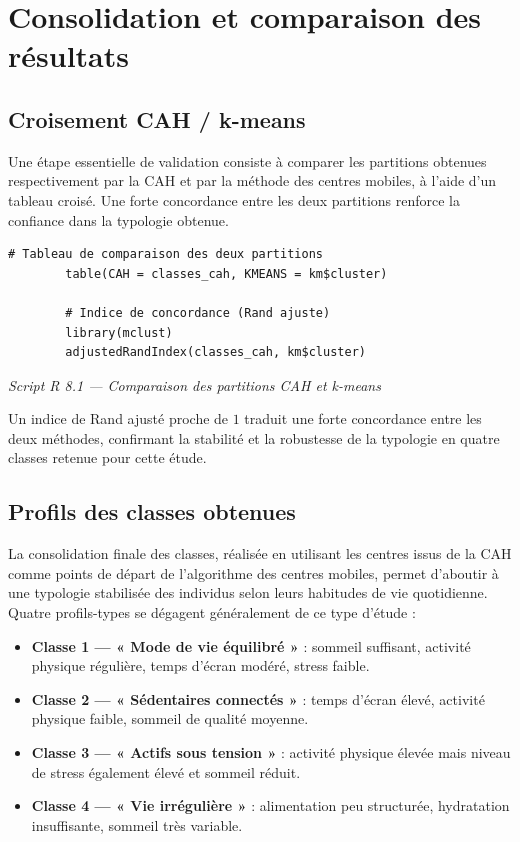 \documentclass[11pt,a4paper]{report}
\newcommand{\rcaption}[1]{%
	\begin{center}\small\itshape\color{grey} #1\end{center}\vspace{4pt}
}
\begin{document}
	\chapter{Consolidation et comparaison des résultats}
	
	\section{Croisement CAH / k-means}
	
	Une étape essentielle de validation consiste à comparer les partitions obtenues respectivement par la CAH et par la méthode des centres mobiles, à l'aide d'un tableau croisé. Une forte concordance entre les deux partitions renforce la confiance dans la typologie obtenue.
	
	\begin{lstlisting}[style=rstyle]
		# Tableau de comparaison des deux partitions
		table(CAH = classes_cah, KMEANS = km$cluster)
		
		# Indice de concordance (Rand ajuste)
		library(mclust)
		adjustedRandIndex(classes_cah, km$cluster)
	\end{lstlisting}
	\rcaption{Script R 8.1 --- Comparaison des partitions CAH et k-means}
	
	\begin{retenir}
		Un indice de Rand ajusté proche de $1$ traduit une forte concordance entre les deux méthodes, confirmant la stabilité et la robustesse de la typologie en quatre classes retenue pour cette étude.
	\end{retenir}
	
	\section{Profils des classes obtenues}
	
	La consolidation finale des classes, réalisée en utilisant les centres issus de la CAH comme points de départ de l'algorithme des centres mobiles, permet d'aboutir à une typologie stabilisée des individus selon leurs habitudes de vie quotidienne. Quatre profils-types se dégagent généralement de ce type d'étude :
	
	\begin{itemize}
		\item \textbf{Classe 1 --- « Mode de vie équilibré »} : sommeil suffisant, activité physique régulière, temps d'écran modéré, stress faible.
		\item \textbf{Classe 2 --- « Sédentaires connectés »} : temps d'écran élevé, activité physique faible, sommeil de qualité moyenne.
		\item \textbf{Classe 3 --- « Actifs sous tension »} : activité physique élevée mais niveau de stress également élevé et sommeil réduit.
		\item \textbf{Classe 4 --- « Vie irrégulière »} : alimentation peu structurée, hydratation insuffisante, sommeil très variable.
	\end{itemize}
	
\end{document}
